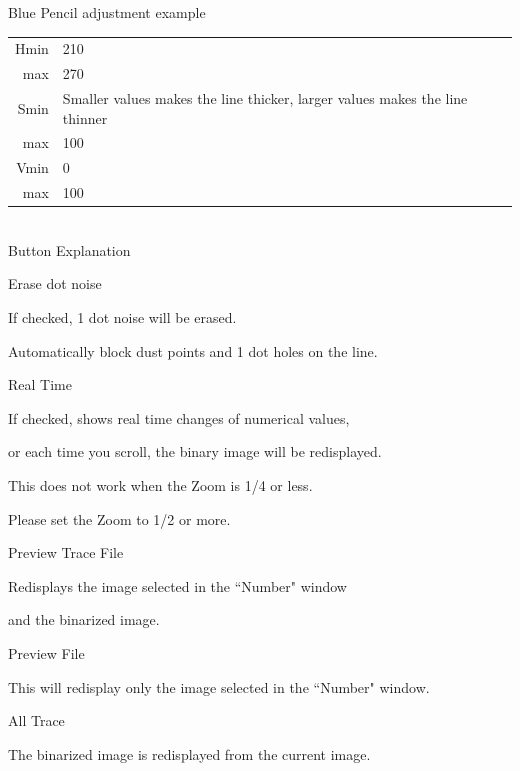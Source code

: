 \documentclass[a4paper,10pt]{article}
\begin{document}
Blue Pencil adjustment example\\[-1.25em]

\setlength{\tabcolsep}{0em}
\renewcommand{\arraystretch}{1.0}
\hspace{4.0em}\begin{tabular}{rl}
Hmin \hspace{1.0em} & 210\\
max \hspace{1.0em} & 270\\
Smin \hspace{1.0em} & Smaller values makes the line thicker, larger values makes the line thinner\\
max \hspace{1.0em} & 100\\
Vmin \hspace{1.0em} & 0\\
max \hspace{1.0em} & 100\\
\end{tabular}\\[-0.5em]

\noindent Button Explanation\par
Erase dot noise\par
\hspace{4.0em} If checked, 1 dot noise will be erased.\par
\hspace{4.0em} Automatically block dust points and 1 dot holes on the line.\par
Real Time\par
\hspace{4.0em} If checked, shows real time changes of numerical values,\par
\hspace{4.0em} or each time you scroll, the binary image will be redisplayed.\par
\hspace{4.0em} This does not work when the Zoom is 1/4 or less.\par
\hspace{4.0em} Please set the Zoom to 1/2 or more.\par
Preview Trace File\par
\hspace{4.0em} Redisplays the image selected in the “Number" window\par
\hspace{4.0em} and the binarized image.\par
Preview File\par
\hspace{4.0em} This will redisplay only the image selected in the “Number" window.\par
All Trace\par
\hspace{4.0em} The binarized image is redisplayed from the current image.\\
\end{document}
